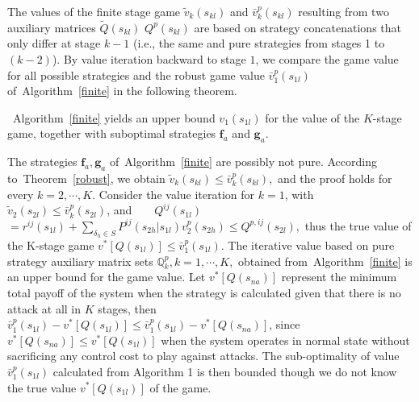 The values of the finite stage game $\tilde{v}_k(s_{kl})$ and $\bar{v}_k^p(s_{kl})$ resulting from two auxiliary matrices $\tilde{Q}(s_{kl})$ $Q^p(s_{kl})$ are based on strategy concatenations that only differ at stage $k-1$ (i.e., the same and pure strategies from stages 1 to $(k-2)$). By value iteration backward to stage $1$, we compare the game value for all possible strategies and the robust game value $\bar{v}_1^p(s_{1l})$ of~Algorithm~\ref{finite} in the following theorem.
\begin{cor}
~Algorithm~\ref{finite} yields an upper bound $v_1(s_{1l})$ for the value of the $K$-stage game, together with suboptimal strategies $\mathbf{f}_{a}$ and $\mathbf{g}_{a}$. 
\end{cor}
The strategies $\mathbf{f}_{a}, \mathbf{g}_{a}$ of~Algorithm~\ref{finite} are possibly not pure. %
According to~Theorem~\ref{robust}, we obtain $\tilde{v}_{k}(s_{kl})\leqslant \bar{v}^{p}_{k}(s_{kl}),$ and the proof holds for every $k=2,\cdots,K$. Consider the value iteration for $k=1$, with 
$\tilde{v}_{2}(s_{2l})\leqslant \bar{v}^p_k(s_{2l})$, and $\text{\ }\quad Q^{ij}( s_{1l})$
$=r^{ij}(s_{1l})+\sum\limits_{\delta_h\in S}{P}^{ij}(s_{2h}|s_{1l})v^{p}_{2}(s_{2h}) \leqslant Q^{p,ij}(s_{2l}),$
thus the true value of the K-stage game $v^{*}[Q(s_{1l})] \leqslant \bar{v}^{p}_{1}(s_{1l})$. The iterative value based on pure strategy auxiliary matrix sets $\mathbb{Q}_{k}^p, k=1,\cdots, K,$ obtained from~Algorithm~\ref{finite} is an upper bound for the game value.
Let $v^*[Q(s_{na})]$ represent the minimum total payoff of the system when the strategy is calculated given that there is no attack at all in $K$ stages, then $\bar{v}^{p}_{1}(s_{1l})-v^{*}[Q(s_{1l})] \leqslant \bar{v}^{p}_{1}(s_{1l})-v^*[Q(s_{na})]$, since  $v^*[Q(s_{na})] \leqslant v^{*}[Q(s_{1l})]$ when the system operates in normal state without sacrificing any control cost to play against attacks. The sub-optimality of value $\bar{v}^{p}_{1}(s_{1l})$ calculated from Algorithm 1 is then bounded though we do not know the true value $v^{*}[Q(s_{1l})]$ of the game.

